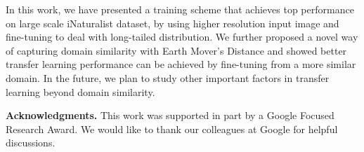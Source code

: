 \documentclass[10pt,twocolumn,letterpaper]{article}
\begin{document}
In this work, we have presented a training scheme that achieves top performance on large scale iNaturalist dataset, by using higher resolution input image and fine-tuning to deal with long-tailed distribution.
We further proposed a novel way of capturing domain similarity with Earth Mover's Distance and showed better transfer learning performance can be achieved by fine-tuning from a more similar domain.
In the future, we plan to study other important factors in transfer learning beyond domain similarity. 


\vspace{5pt}
\par\noindent\textbf{Acknowledgments.}
This work was supported in part by a Google Focused Research Award. We would like to thank our colleagues at Google for helpful discussions.




\newpage
{\small


}
\end{document}
